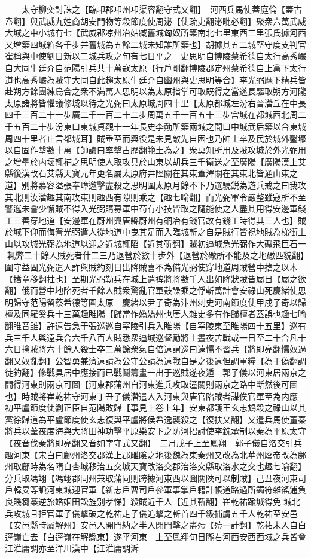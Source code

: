 　　太守柳奕討誅之【臨卭郡卭州卭渠容翻守式又翻】　河西兵馬使蓋庭倫【蓋古盍翻】與武威九姓商胡安門物等殺節度使周泌【使疏吏翻泌毗必翻】聚衆六萬武威大城之中小城有七【武威郡凉州冶姑臧舊城匈奴所築南北七里東西三里張氏據河西又增築四城箱各千步并舊城為五餘二城未知誰所築也】胡據其五二城堅守度支判官崔稱與中使劉日新以二城兵攻之旬有七日平之　史思明自博陵蔡希德自太行高秀巗自大同牛廷介自范陽引兵共十萬寇太原【行戶剛翻博陵郡定州蔡希德自上黨下太行道也高秀巗為賊守大同自此趨太原牛廷介自幽州與史思明等合】李光弼麾下精兵皆赴朔方餘團練烏合之衆不滿萬人思明以為太原指掌可取既得之當遂長驅取朔方河隴太原諸將皆懼議修城以待之光弼曰太原城周四十里【太原都城左汾右晉濳丘在中長四千三百二十一步廣二千一百二十二步周萬五千一百五十三步宫城在都城西北周二千五百二十步汾東曰東城貞觀十一年長史李勣所築兩城之間曰中城武后築以合東城周四十里者止言都城耳】賊垂至而興役是未見敵先自困也乃帥士卒及民於城外鑿壕以自固作墼數十萬【帥讀曰率墼古歷翻範土為之】衆莫知所用及賊攻城於外光弼用之增壘於内壞輒補之思明使人取攻具於山東以胡兵三千衛送之至廣陽【廣陽漢上艾縣後漢改石艾縣天寶元年更名屬太原府井陘關在其東葦澤關在其東北皆通山東之道】别將慕容溢張奉璋邀擊盡殺之思明圍太原月餘不下乃選驍鋭為遊兵戒之曰我攻其北則汝濳趣其南攻東則趣西有隙則乘之【趣七喻翻】而光弼軍令嚴整雖寇所不至警邏未嘗少懈賊不得入光弼購募軍中苟有小技皆取之隨能使之人盡其用得安邊軍錢工三善穿地道【安邊軍在蔚州興唐縣蔚州有銅冶有錢官故有錢工時得其三人也】賊於城下仰而侮詈光弼遣人從地道中曳其足而入臨城斬之自是賊行皆視地賊為梯衝土山以攻城光弼為地道以迎之近城輒䧟【近其靳翻】賊初逼城急光弼作大礮飛巨石一輒弊二十餘人賊死者什二三乃退營於數十步外【退營於礮所不能及之地礮匹貌翻】圍守益固光弼遣人詐與賊約刻日出降賊喜不為備光弼使穿地道周賊營中搘之以木【搘章移翻拄也】至期光弼勒兵在城上遣禆將將數千人出如降狀賊皆屬目【屬之欲翻】俄而營中地陷死者千餘人賊衆驚亂官軍鼓譟乘之俘斬萬計會安祿山死慶緒使思明歸守范陽留蔡希德等圍太原　慶緒以尹子奇為汴州刺史河南節度使甲戍子奇以歸檀及同羅奚兵十三萬趣睢陽【歸當作媯媯州也唐人雜史多有作歸檀者蓋誤也趣七喻翻睢音雖】許遠告急于張巡巡自寜陵引兵入睢陽【自寜陵東至睢陽四十五里】巡有兵三千人與遠兵合六千八百人賊悉衆逼城巡督勵將士晝夜苦戰或一日至二十合凡十六日擒賊將六十餘人殺士卒二萬餘衆氣自倍遠謂巡曰遠懦不習兵【將即亮翻懦奴過翻乂奴亂翻】公智勇兼濟遠請為公守公請為遠戰自是之後遠但調軍糧【為于偽翻調徒釣翻】修戰具居中應接而已戰鬭籌畫一出于巡賊遂夜遁　郭子儀以河東居兩京之間得河東則兩京可圖【河東郡蒲州自河東進兵攻取潼關則兩京之路中斷然後可圖也】時賊將崔乾祐守河東丁丑子儀濳遣人入河東與唐官陷賊者謀俟官軍至為内應　初平盧節度使劉正臣自范陽敗歸【事見上卷上年】安東都護王玄志鴆殺之祿山以其黨徐歸道為平盧節度使玄志復與平盧將侯希逸襲殺之【復扶又翻】又遣兵馬使董秦將兵以葦茷度海與大將田神功擊平原樂安下之防河招討使李銑承制以秦為平原太守【茷音伐秦將即亮翻又音如字守式又翻】　二月戊子上至鳳翔　郭子儀自洛交引兵趣河東【宋白曰鄜州洛交郡漢上郡雕隂之地後魏為東秦州又改為北華州廢帝改為鄜州取鄜畤為名隋自杏城移治五交城天寶改洛交郡治洛交縣取洛水之交也趣七喻翻】分兵取馮翊【馮翊郡同州兼取蒲同則跨據河東西以圖關陜可以制賊】己丑夜河東司戶韓旻等飜河東城迎官軍【新志戶曹司戶參軍事掌戶籍計帳道路過所蠲符雜徭逋負良賤芻槀逆旅婚姻田訟旌别孝悌】殺賊近千人【近其靳翻】崔乾祐踰城得免城北兵攻城且拒官軍子儀擊破之乾祐走子儀追擊之斬首四千級捕虜五千人乾祐至安邑【安邑縣時屬解州】安邑人開門納之半入閉門擊之盡殪【殪一計翻】乾祐未入自白逕嶺亡去【白逕嶺在解縣東】遂平河東　上至鳳翔旬日隴右河西安西西域之兵皆會江淮庸調亦至洋川漢中【江淮庸調泝